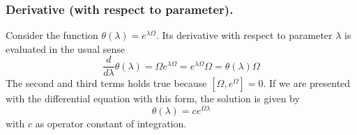 \documentclass[../main.tex]{subfiles}
\begin{document}
\subsubsection{Derivative (with respect to parameter).}
Consider the function $\theta(\lambda)=e^{\lambda\Omega}$.
Its derivative with respect to parameter $\lambda$ is evaluated in the usual sense
\begin{equation*}
	\frac{d}{d\lambda}\theta(\lambda)=\Omega e^{\lambda\Omega}=e^{\lambda\Omega}\Omega=\theta(\lambda)\Omega
\end{equation*}
The second and third terms holds true because $[\Omega,e^{\Omega}]=0$.
If we are presented with the differential equation with this form, the solution is given by
\begin{equation*}
	\theta(\lambda)=ce^{\Omega \lambda}
\end{equation*}
with $c$ as operator constant of integration.
\end{document}
